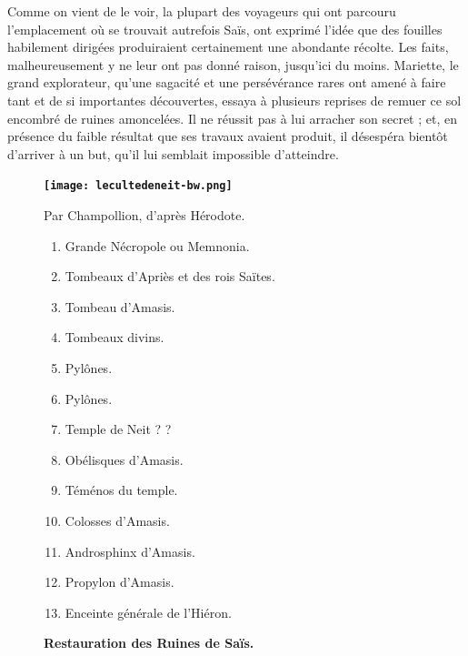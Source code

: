 \documentclass[a4paper, 11pt, oneside]{article}
\begin{document}
Comme on vient de le voir, la plupart des voyageurs qui ont parcouru l'emplacement où se trouvait autrefois Saïs, ont exprimé l'idée que des fouilles habilement dirigées produiraient certainement une abondante récolte. Les faits, malheureusement y ne leur ont pas donné raison, jusqu'ici du moins. Mariette, le grand explorateur, qu'une sagacité et une persévérance rares ont amené à faire tant et de si importantes découvertes, essaya à plusieurs reprises de remuer ce sol encombré de ruines amoncelées. Il ne réussit pas à lui arracher son secret ; et, en présence du faible résultat que ses travaux avaient produit, il désespéra bientôt d'arriver à un but, qu'il lui semblait impossible d'atteindre.
\begin{figure}[H]
\centering\Fontlukas\bfseries
\texttt{[image: lecultedeneit-bw.png]}
\caption{\Fontlukas\bfseries\textbf{Restauration des Ruines de Saïs.}}
Par Champollion, d'après Hérodote.
\footnotesize
\begin{enumerate}
    \item Grande Nécropole ou Memnonia.
    \item Tombeaux d'Apriès et des rois Saïtes.
    \item Tombeau d'Amasis.
    \item Tombeaux divins.
    \item Pylônes.
    \item Pylônes.
    \item Temple de Neit ? ?
    \item Obélisques d'Amasis.
    \item Téménos du temple.
    \item Colosses d'Amasis.
    \item Androsphinx d'Amasis.
    \item Propylon d'Amasis.
    \item Enceinte générale de l'Hiéron.
\end{enumerate}
\end{figure}
\end{document}
